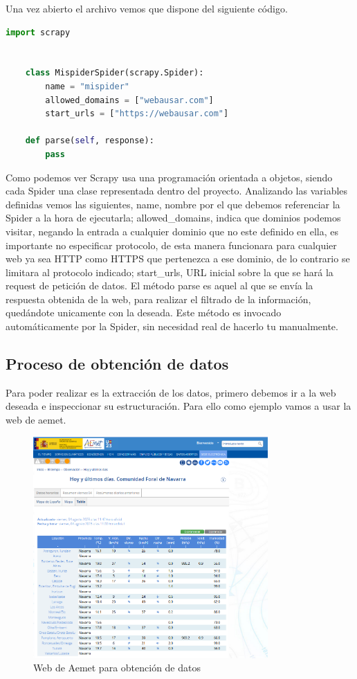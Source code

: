 Una vez abierto el archivo vemos que dispone del siguiente código.

\begin{lstlisting}[language=Python, caption={Spider recién generada}]
	import scrapy
	
	
	class MispiderSpider(scrapy.Spider):
		name = "mispider"
		allowed_domains = ["webausar.com"]
		start_urls = ["https://webausar.com"]
	
	def parse(self, response):
		pass
\end{lstlisting}

Como podemos ver Scrapy usa una programación orientada a objetos, siendo cada Spider una clase representada dentro del proyecto.\newline
Analizando las variables definidas vemos las siguientes, name, nombre por el que debemos referenciar la Spider a la hora de ejecutarla; allowed\_domains, indica que dominios podemos visitar, negando la entrada a cualquier dominio que no este definido en ella, es importante no especificar protocolo, de esta manera funcionara para cualquier web ya sea HTTP como HTTPS que pertenezca a ese dominio, de lo contrario se limitara al protocolo indicado; start\_urls, URL inicial sobre la que se hará la request de petición de datos.\newline
El método parse es aquel al que se envía la respuesta obtenida de la web, para realizar el filtrado de la información, quedándote unicamente con la deseada. Este método es invocado automáticamente por la Spider, sin necesidad real de hacerlo tu manualmente.

\subsection{Proceso de obtención de datos}
Para poder realizar es la extracción de los datos, primero debemos ir a la web deseada e inspeccionar su estructuración. Para ello como ejemplo vamos a usar la web de aemet.\newline

\begin{figure} [H]
	\centering
	\includegraphics[width=0.8\textwidth]{fig/code_aemet.png}
	\caption[URL de inicio para obtener los códigos de las estaciones de Aemet]{Web de Aemet para obtención de datos}
	\label{fig:ej13}
\end{figure}

